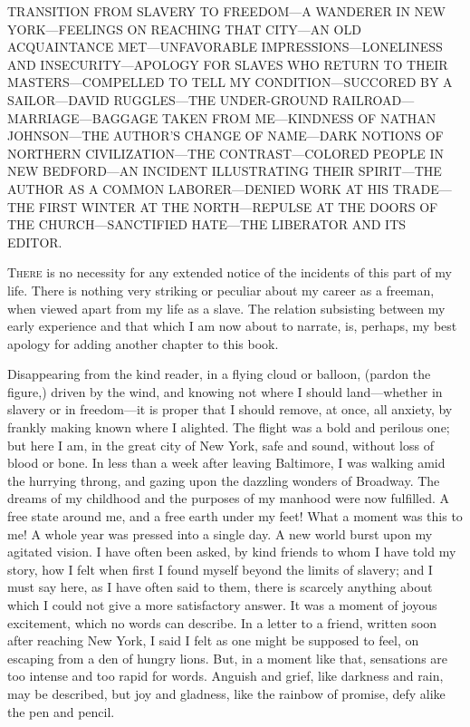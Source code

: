 {TRANSITION FROM SLAVERY TO FREEDOM---A WANDERER IN NEW YORK---FEELINGS
ON REACHING THAT CITY---AN OLD ACQUAINTANCE MET---UNFAVORABLE
IMPRESSIONS---LONELINESS AND INSECURITY---APOLOGY FOR SLAVES WHO RETURN
TO THEIR MASTERS---COMPELLED TO TELL MY CONDITION---SUCCORED BY A
SAILOR---DAVID RUGGLES---THE UNDER-GROUND RAILROAD---MARRIAGE---BAGGAGE
TAKEN FROM ME---KINDNESS OF NATHAN JOHNSON---THE AUTHOR'S CHANGE OF
NAME---DARK NOTIONS OF NORTHERN CIVILIZATION---THE CONTRAST---COLORED
PEOPLE IN NEW BEDFORD---AN INCIDENT ILLUSTRATING THEIR SPIRIT---THE
AUTHOR AS A COMMON LABORER---DENIED WORK AT HIS TRADE---THE FIRST WINTER
AT THE NORTH---REPULSE AT THE DOORS OF THE CHURCH---SANCTIFIED
HATE---THE LIBERATOR AND ITS EDITOR.}

\textsc{There} is no necessity for any extended notice of the incidents
of this part of my life. There is nothing very striking or peculiar
about my career as a freeman, when viewed apart from my life as a slave.
The relation subsisting between my early experience and that which I am
now about to narrate, is, perhaps, my best apology for adding another
chapter to this book.

Disappearing from the kind reader, in a flying cloud or balloon, (pardon
the figure,) driven by the {\protect\hypertarget{336}{}{}}wind, and
knowing not where I should land---whether in slavery or in freedom---it
is proper that I should remove, at once, all anxiety, by frankly making
known where I alighted. The flight was a bold and perilous one; but here
I am, in the great city of New York, safe and sound, without loss of
blood or bone. In less than a week after leaving Baltimore, I was
walking amid the hurrying throng, and gazing upon the dazzling wonders
of Broadway. The dreams of my childhood and the purposes of my manhood
were now fulfilled. A free state around me, and a free earth under my
feet! What a moment was this to me! A whole year was pressed into a
single day. A new world burst upon my agitated vision. I have often been
asked, by kind friends to whom I have told my story, how I felt when
first I found myself beyond the limits of slavery; and I must say here,
as I have often said to them, there is scarcely anything about which I
could not give a more satisfactory answer. It was a moment of joyous
excitement, which no words can describe. In a letter to a friend,
written soon after reaching New York, I said I felt as one might be
supposed to feel, on escaping from a den of hungry lions. But, in a
moment like that, sensations are too intense and too rapid for words.
Anguish and grief, like darkness and rain, may be described, but joy and
gladness, like the rainbow of promise, defy alike the pen and pencil.

